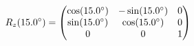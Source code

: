 \documentclass[preview]{standalone}
\begin{document}
\begin{align*}
\special{dvisvgm:raw <g id='unique000'>}R_z(15.0^\circ) = \begin{pmatrix} \cos(15.0^\circ) & -\sin(15.0^\circ) & 0 \\ \sin(15.0^\circ) & \cos(15.0^\circ) & 0 \\ 0 & 0 & 1 \end{pmatrix}\special{dvisvgm:raw </g>}
\end{align*}
\end{document}
